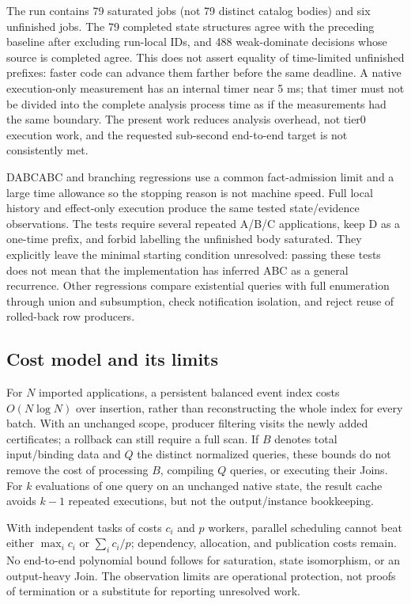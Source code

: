 \documentclass[11pt,a4paper]{article}
\begin{document}
The run contains 79 saturated jobs (not 79 distinct catalog bodies) and six
unfinished jobs. The 79
completed state structures agree with the preceding baseline after excluding
run-local IDs, and 488 weak-dominate decisions whose source is completed agree.
This does not assert equality of time-limited unfinished prefixes: faster code
can advance them farther before the same deadline. A native execution-only
measurement has an internal timer near 5 ms; that timer must not be divided into
the complete analysis process time as if the measurements had the same boundary.
The present work reduces analysis overhead, not tier0 execution work, and the
requested sub-second end-to-end target is not consistently met.

DABCABC and branching regressions use a common fact-admission limit and a large
time allowance so the stopping reason is not machine speed. Full local history
and effect-only execution produce the same tested state/evidence observations.
The tests require several repeated A/B/C applications, keep D as a one-time
prefix, and forbid labelling the unfinished body saturated. They explicitly
leave the minimal starting condition unresolved: passing these tests does not
mean that the implementation has inferred ABC as a general recurrence. Other
regressions compare existential queries with full enumeration through union and
subsumption, check notification isolation, and reject reuse of rolled-back row
producers.

\subsection{Cost model and its limits}
For $N$ imported applications, a persistent balanced event index costs
$O(N\log N)$ over insertion, rather than reconstructing the whole index for every
batch. With an unchanged scope, producer filtering visits the newly added
certificates; a rollback can still require a full scan. If $B$ denotes total
input/binding data and $Q$ the distinct normalized queries, these bounds do not
remove the cost of processing $B$, compiling $Q$ queries, or executing their Joins.
For $k$ evaluations of one query on an unchanged native state, the result cache
avoids $k-1$ repeated executions, but not the output/instance bookkeeping.

With independent tasks of costs $c_i$ and $p$ workers, parallel scheduling cannot
beat either $\max_i c_i$ or $\sum_i c_i/p$; dependency, allocation, and publication
costs remain. No end-to-end polynomial bound follows for saturation, state
isomorphism, or an output-heavy Join. The observation limits are operational
protection, not proofs of termination or a substitute for reporting unresolved work.
\end{document}
